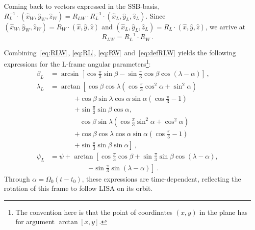\documentclass[aps,showpacs,twocolumn,prd,superscriptaddress,nofootinbib]{revtex4-1}
\newcommand{\be}{\begin{equation}}
\newcommand{\ee}{\end{equation}}
\newcommand{\bsub}{\begin{subequations}}
\newcommand{\esub}{\end{subequations}}
\newcommand{\nn}{\nonumber}
\begin{document}
Coming back to vectors expressed in the SSB-basis, $R_{L}^{-1} \cdot (\hat{x}_{W}, \hat{y}_{W}, \hat{z}_{W}) = R_{LW} \cdot R_{L}^{-1} \cdot (\hat{x}_{L}, \hat{y}_{L}, \hat{z}_{L})$. Since $ (\hat{x}_{W}, \hat{y}_{W}, \hat{z}_{W}) = R_{W} \cdot (\hat{x}, \hat{y}, \hat{z})$ and $ (\hat{x}_{L}, \hat{y}_{L}, \hat{z}_{L}) = R_{L} \cdot (\hat{x}, \hat{y}, \hat{z})$, we arrive at
\be\label{eq:RLW}
	R_{LW} = R_{L}^{-1} \cdot R_{W} \,.
\ee

Combining~\eqref{eq:RLW}, \eqref{eq:RL}, \eqref{eq:RW} and~\eqref{eq:defRLW} yields the following expressions for the L-frame angular parameters\footnote{The convention here is that the point of coordinates $(x,y)$ in the plane has for argument $\arctan\left[ x, y \right]$.}:
\bsub\label{eq:Lframeangles}
\begin{align}
	\beta_{L} &= \arcsin \left[ \cos \frac{\pi}{3} \sin \beta - \sin \frac{\pi}{3} \cos \beta \cos \left( \lambda - \alpha \right) \right] \,,\\
	\lambda_{L} &= \arctan \left[ \cos\beta \cos\lambda \left( \cos \frac{\pi}{3} \cos^{2}\alpha + \sin^{2}\alpha \right) \right. \nn\\
	& \qquad\quad\;\; \left. + \cos\beta \sin\lambda \cos\alpha \sin\alpha \left( \cos\frac{\pi}{3} - 1 \right) \right. \nn\\
	& \qquad\quad\;\; \left. + \sin\frac{\pi}{3} \sin\beta \cos\alpha , \right. \nn\\
	& \qquad\qquad\; \left. \cos\beta \sin\lambda \left( \cos \frac{\pi}{3} \sin^{2}\alpha + \cos^{2}\alpha \right) \right. \nn\\
	& \qquad\quad\;\; \left. + \cos\beta \cos\lambda \cos\alpha \sin\alpha \left( \cos\frac{\pi}{3} - 1 \right) \right. \nn\\
	& \qquad\quad\;\; \left. + \sin\frac{\pi}{3} \sin\beta \sin\alpha \right] \,,\\
	\psi_{L} &= \psi + \arctan \left[\cos\frac{\pi}{3}\cos\beta + \sin\frac{\pi}{3} \sin\beta \cos(\lambda - \alpha), \right. \nn\\
	&\qquad\qquad\quad\;\; \left.-\sin \frac{\pi}{3} \sin(\lambda - \alpha) \right] \,.
\end{align}
\esub
Through $\alpha = \Omega_{0} (t-t_{0}) $, these expressions are time-dependent, reflecting the rotation of this frame to follow LISA on its orbit.
\end{document}
